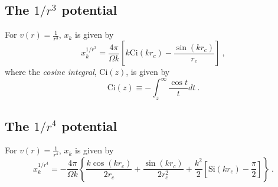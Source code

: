 \subsection*{The $1/r^3$ potential}
For $v(r) = \frac{1}{r^3}$, $x_k$ is given by
\begin{equation}
x_k^{1/r^3} = \frac{4\pi}{\Omega k} 
\left[k\text{Ci}(k r_c) - \frac{\sin(k r_c)}{r_c} \right]\:,
\end{equation}
where the {\em cosine integral}, $\text{Ci}(z)$, is given by
\begin{equation}
\text{Ci}(z) \equiv -\int_z^\infty \frac{\cos t}{t} dt\:.
\end{equation}

\subsection*{The $1/r^4$ potential}
For $v(r) = \frac{1}{r^4}$, $x_k$ is given by
\begin{equation}
x_k^{1/r^4} = -\frac{4 \pi}{\Omega k} 
\left\{
\frac{k \cos(k r_c)}{2 r_c} + \frac{\sin(k r_c)}{2r_c^2} + \frac{k^2}{2} \left[ \text{Si}(k r_c) - \frac{\pi}{2}\right]\right\}\:.
\end{equation}


